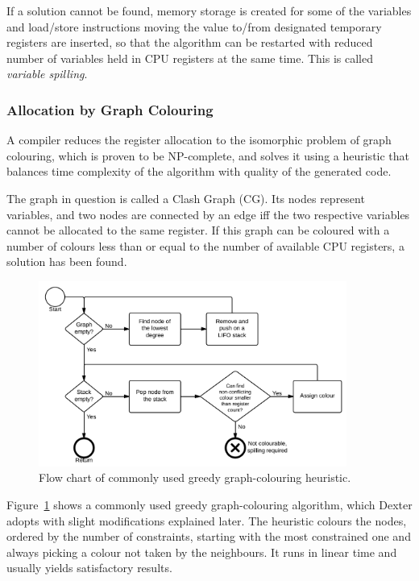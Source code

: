 \documentclass[12pt,twoside,notitlepage]{report}
\begin{document}
If a solution cannot be found, memory storage is created for some of the variables and load/store instructions moving the value to/from designated temporary registers are inserted, so that the algorithm can be restarted with reduced number of variables held in CPU registers at the same time. This is called \emph{variable spilling}.

\subsubsection{Allocation by Graph Colouring}

A compiler reduces the register allocation to the isomorphic problem of graph colouring, which is proven to be NP-complete, and solves it using a heuristic that balances time complexity of the algorithm with quality of the generated code. 

The graph in question is called a Clash Graph (CG). Its nodes represent variables, and two nodes are connected by an edge iff the two respective variables cannot be allocated to the same register. If this graph can be coloured with a number of colours less than or equal to the number of available CPU registers, a solution has been found. 

\begin{figure}
	\centerline{	
		\includegraphics[width=0.9\textwidth]{figs/fig_implementation_gc.png}
	}
	\caption{Flow chart of commonly used greedy graph-colouring heuristic.}
	\label{fig:Implementation_GraphColouring}
\end{figure}

Figure~\ref{fig:Implementation_GraphColouring} shows a commonly used greedy graph-colouring algorithm, which Dexter adopts with slight modifications explained later. The heuristic colours the nodes, ordered by the number of constraints, starting with the most constrained one and always picking a colour not taken by the neighbours. It runs in linear time and usually yields satisfactory results.
\end{document}
